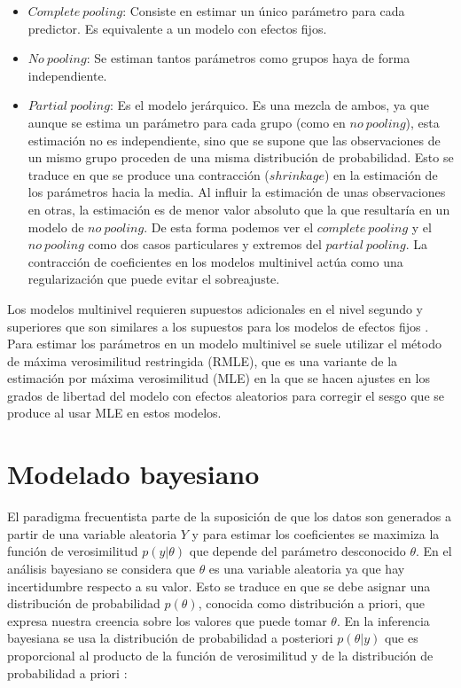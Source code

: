 \documentclass[
  12pt,
  a4paper,
  extrafontsizes,
  onecolumn,
  openright,
  table]{memoir}
\providecommand{\tightlist}{%
  \setlength{\itemsep}{0pt}\setlength{\parskip}{0pt}}\usepackage{longtable,booktabs,array}
\begin{document}
\begin{itemize}
\tightlist
\item
  \(Complete\ pooling\): Consiste en estimar un único parámetro para
  cada predictor. Es equivalente a un modelo con efectos fijos.
\item
  \(No\ pooling\): Se estiman tantos parámetros como grupos haya de
  forma independiente.
\item
  \(Partial\ pooling\): Es el modelo jerárquico. Es una mezcla de ambos,
  ya que aunque se estima un parámetro para cada grupo (como en
  \(no\ pooling\)), esta estimación no es independiente, sino que se
  supone que las observaciones de un mismo grupo proceden de una misma
  distribución de probabilidad. Esto se traduce en que se produce una
  contracción (\(shrinkage\)) en la estimación de los parámetros hacia
  la media. Al influir la estimación de unas observaciones en otras, la
  estimación es de menor valor absoluto que la que resultaría en un
  modelo de \(no\ pooling\). De esta forma podemos ver el
  \(complete\ pooling\) y el \(no\ pooling\) como dos casos particulares
  y extremos del \(partial\ pooling\). La contracción de coeficientes en
  los modelos multinivel actúa como una regularización que puede evitar
  el sobreajuste.
\end{itemize}

Los modelos multinivel requieren supuestos adicionales en el nivel
segundo y superiores que son similares a los supuestos para los modelos
de efectos fijos \autocite[ver][pp.~43]{chen2021}. Para estimar los
parámetros en un modelo multinivel se suele utilizar el método de máxima
verosimilitud restringida (RMLE), que es una variante de la estimación
por máxima verosimilitud (MLE) en la que se hacen ajustes en los grados
de libertad del modelo con efectos aleatorios para corregir el sesgo que
se produce al usar MLE en estos modelos.

\hypertarget{sec-bayesiano}{%
\section{Modelado bayesiano}\label{sec-bayesiano}}

El paradigma frecuentista parte de la suposición de que los datos son
generados a partir de una variable aleatoria \(Y\) y para estimar los
coeficientes se maximiza la función de verosimilitud \(p(y | \theta)\)
que depende del parámetro desconocido \(\theta\). En el análisis
bayesiano se considera que \(\theta\) es una variable aleatoria ya que
hay incertidumbre respecto a su valor. Esto se traduce en que se debe
asignar una distribución de probabilidad \(p(\theta)\), conocida como
distribución a priori, que expresa nuestra creencia sobre los valores
que puede tomar \(\theta\). En la inferencia bayesiana se usa la
distribución de probabilidad a posteriori \(p(\theta | y)\) que es
proporcional al producto de la función de verosimilitud y de la
distribución de probabilidad a priori \autocite[ver][]{nicenboim2023}:
\end{document}
